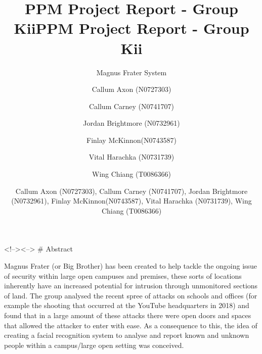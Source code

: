 \documentclass[
  english,
  a4paper,
,tablecaptionabove
]{scrartcl}
\title{PPM Project Report - Group Kii}
\subtitle{Magnus Frater System}
\author{Callum Axon (N0727303) \and Callum Carney (N0741707) \and Jordan Brightmore (N0732961) \and Finlay McKinnon(N0743587) \and Vital Harachka (N0731739) \and Wing Chiang (T0086366)}
\date{}
\title{PPM Project Report - Group Kii}
\author{Callum Axon (N0727303), Callum Carney (N0741707), Jordan Brightmore (N0732961), Finlay McKinnon(N0743587), Vital Harachka (N0731739), Wing Chiang (T0086366)}
\begin{document}

\begin{titlepage}
\afterpage{\restorepagecolor}
\newcommand{\colorRule}[3][black]{\textcolor[HTML]{#1}{\rule{#2}{#3}}}
\end{titlepage}
\restoregeometry




\textless!--\textgreater\textless--\textgreater{} \# Abstract

Magnus Frater (or Big Brother) has been created to help tackle the
ongoing issue of security within large open campuses and premises, these
sorts of locations inherently have an increased potential for intrusion
through unmonitored sections of land. The group analysed the recent
spree of attacks on schools and offices (for example the shooting that
occurred at the YouTube headquarters in 2018) and found that in a large
amount of these attacks there were open doors and spaces that allowed
the attacker to enter with ease. As a consequence to this, the idea of
creating a facial recognition system to analyse and report known and
unknown people within a campus/large open setting was conceived.
\end{document}
